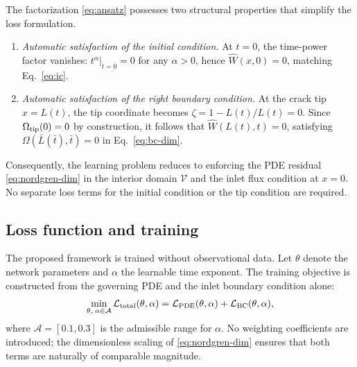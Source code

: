 \documentclass[a4paper,fleqn]{cas-sc}
\begin{document}
The factorization \eqref{eq:ansatz} possesses two structural
properties that simplify the loss formulation.

\begin{enumerate}
  \item[\textbf{P1.}]
  \textit{Automatic satisfaction of the initial condition.}
  At $t = 0$, the time-power factor vanishes: $t^{\alpha}|_{t=0} =
  0$ for any $\alpha > 0$, hence $\widehat{W}(x,0) = 0$, matching
  Eq.~\eqref{eq:ic}.

  \item[\textbf{P2.}]
  \textit{Automatic satisfaction of the right boundary condition.}
  At the crack tip $x = L(t)$, the tip coordinate becomes
  $\zeta = 1 - L(t)/L(t) = 0$. Since
  $\Omega_{\rm tip}(0) = 0$ by construction, it follows that
  $\widehat{W}(L(t), t) = 0$, satisfying
  $\Omega(\bar{L}(\bar{t}),\bar{t}) = 0$ in
  Eq.~\eqref{eq:bc-dim}.
\end{enumerate}

\noindent
Consequently, the learning problem reduces to enforcing the
PDE residual \eqref{eq:nordgren-dim} in the interior domain
$\mathcal{V}$ and the inlet flux condition at $x = 0$.
No separate loss terms for the initial condition or the tip
condition are required.

\subsection{Loss function and training}\label{sec:training}

The proposed framework is trained without observational data. Let
$\theta$ denote the network parameters and $\alpha$ the learnable
time exponent. The training objective is constructed from the
governing PDE and the inlet boundary condition alone:
\begin{equation}
  \min_{\theta,\;\alpha \in \mathcal{A}}
  \mathcal{L}_{\rm total}(\theta, \alpha)
  = \mathcal{L}_{\rm PDE}(\theta, \alpha)
    + \mathcal{L}_{\rm BC}(\theta, \alpha),
  \label{eq:loss-total}
\end{equation}
where $\mathcal{A} = [0.1, 0.3]$ is the admissible range for
$\alpha$. No weighting coefficients are introduced; the
dimensionless scaling of \eqref{eq:nordgren-dim} ensures that both
terms are naturally of comparable magnitude.
\end{document}
